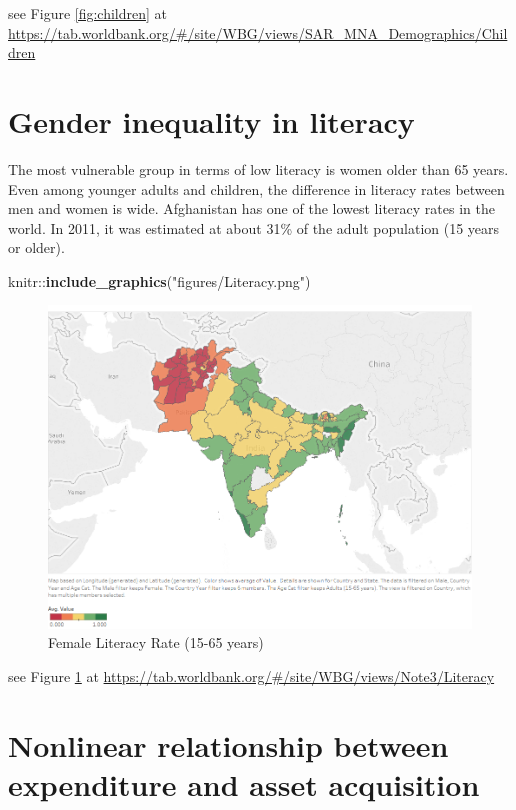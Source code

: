 \documentclass[13 pt,]{book}
\newenvironment{Shaded}{\begin{snugshade}}{\end{snugshade}}
\newcommand{\KeywordTok}[1]{\textcolor[rgb]{0.13,0.29,0.53}{\textbf{{#1}}}}
\newcommand{\StringTok}[1]{\textcolor[rgb]{0.31,0.60,0.02}{{#1}}}
\newcommand{\NormalTok}[1]{{#1}}
\begin{document}
see Figure \ref{fig:children} at
\url{https://tab.worldbank.org/\#/site/WBG/views/SAR_MNA_Demographics/Children}

\section{Gender inequality in
literacy}\label{gender-inequality-in-literacy}

The most vulnerable group in terms of low literacy is women older than
65 years. Even among younger adults and children, the difference in
literacy rates between men and women is wide. Afghanistan has one of the
lowest literacy rates in the world. In 2011, it was estimated at about
31\% of the adult population (15 years or older).

\begin{Shaded}
\begin{Highlighting}[]
\NormalTok{knitr::}\KeywordTok{include_graphics}\NormalTok{(}\StringTok{"figures/Literacy.png"}\NormalTok{)}
\end{Highlighting}
\end{Shaded}

\begin{figure}

{\centering \includegraphics[width=0.8\linewidth]{figures/Literacy} 

}

\caption{Female Literacy Rate (15-65 years)}\label{fig:literacy}
\end{figure}

see Figure \ref{fig:literacy} at
\url{https://tab.worldbank.org/\#/site/WBG/views/Note3/Literacy}

\section{Nonlinear relationship between expenditure and asset
acquisition}\label{nonlinear-relationship-between-expenditure-and-asset-acquisition}
\end{document}
